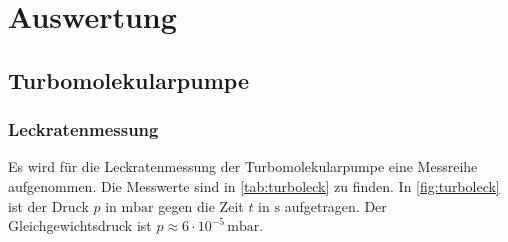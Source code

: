 \section{Auswertung}
\label{sec:Auswertung}

\subsection{Turbomolekularpumpe}
\subsubsection{Leckratenmessung}
Es wird für die Leckratenmessung der Turbomolekularpumpe eine Messreihe aufgenommen. Die Messwerte sind in
\autoref{tab:turboleck} zu finden. In \autoref{fig:turboleck} ist der Druck $p$ in $\si{\milli\bar}$ gegen die
Zeit $t$ in $\si{\second}$ aufgetragen. Der Gleichgewichtsdruck ist $p \approx 6 \cdot 10^{-5} \,\si{\milli\bar}$.
